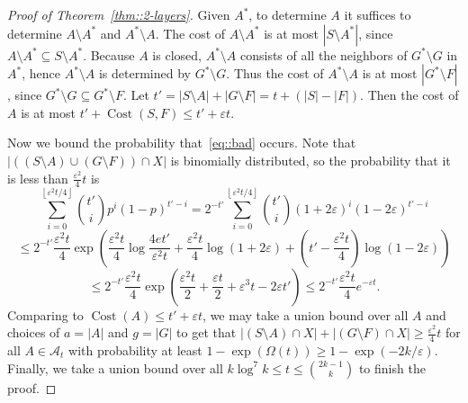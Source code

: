 \documentclass[12pt]{article}
\newcommand{\ep}{\varepsilon}
\newcommand{\A}{\mathcal{A}}
\newcommand{\floor}[1]{\left\lfloor#1\right\rfloor}
\DeclareMathOperator{\cost}{Cost}
\begin{document}
\begin{proof}[Proof of Theorem~\ref{thm::2-layers}]
Given $A^*$, to determine $A$ it suffices to determine $A \setminus A^*$ and $A^* \setminus A$. The cost of $A \setminus A^*$ is at most $|S \setminus A^*|$, since $A \setminus A^* \subseteq S \setminus A^*$. Because $A$ is closed, $A^* \setminus A$ consists of all the neighbors of $G^* \setminus G$ in $A^*$, hence $A^* \setminus A$ is determined by $G^* \setminus G$. Thus the cost of $A^* \setminus A$ is at most $|G^* \setminus F|$, since $G^* \setminus G \subseteq G^* \setminus F$. Let $t' = |S \setminus A| + |G \setminus F| = t + (|S|-|F|)$. Then the cost of $A$ is at most $t' + \cost(S,F) \leq t' + \ep t$.

Now we bound the probability that~\eqref{eq::bad} occurs. Note that $|((S \setminus A) \cup (G \setminus F)) \cap X|$ is binomially distributed, so the probability that it is less than $\frac{\ep^2}{4} t$ is
\[ \sum_{i=0}^{\floor{\ep^2 t/4}} \binom{t'}{i} p^i (1-p)^{t'-i} = 2^{-t'} \sum_{i=0}^{\floor{\ep^2 t/4}} \binom{t'}{i} (1+2\ep)^i (1-2\ep)^{t'-i} \]
\[ \leq 2^{-t'} \frac{\ep^2 t}{4} \exp\left( \frac{\ep^2 t}{4} \log\frac{4et'}{\ep^2 t} + \frac{\ep^2 t}{4} \log(1+2\ep) + \left(t'-\frac{\ep^2 t}{4}\right)\log(1-2\ep) \right) \]
\[ \leq 2^{-t'} \frac{\ep^2 t}{4} \exp\left( \frac{\ep^2 t}{2} + \frac{\ep t}{2} + \ep^3 t - 2\ep t' \right) \leq 2^{-t'} \frac{\ep^2 t}{4} e^{-\ep t} .\]
Comparing to $\cost(A) \leq t' + \ep t$, we may take a union bound over all $A$ and choices of $a=|A|$ and $g=|G|$ to get that $|(S \setminus A) \cap X| + |(G \setminus F) \cap X| \geq \frac{\ep^2}{4} t$ for all $A \in \A_t$ with probability at least $1-\exp(\Omega(t)) \geq 1 - \exp(-2k/\ep)$. Finally, we take a union bound over all $k \log^7 k \leq t \leq \binom{2k-1}{k}$ to finish the proof.
\end{proof}
\end{document}
